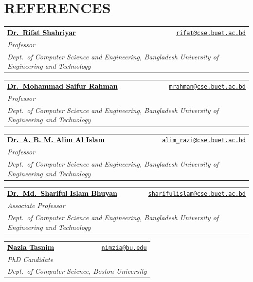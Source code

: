 \documentclass[letterpaper,11pt]{article}
\begin{document}
\newcommand{\referee}[5]{
  \item
    \begin{tabular*}{\linewidth}[t]{l@{\extracolsep{\fill}}r}
      \href{#5}{\textcolor{black}{\textbf{#1}}} & \small\href{mailto:#4}{\nolinkurl{#4}} \\
      \multicolumn{2}{l}{\small\textit{#2}} \\
      \multicolumn{2}{l}{\small\textit{#3}} \\
    \end{tabular*}\vspace{-4pt}
}
\section{REFERENCES}
  \begin{enumerate}[leftmargin=0.32in, labelsep=0.08in, label={\textbf{[\arabic*]}}, itemsep=5pt, topsep=6pt]
    \referee{Dr.\ Rifat Shahriyar}
      {Professor}
      {Dept.\ of Computer Science and Engineering, Bangladesh University of Engineering and Technology}
      {rifat@cse.buet.ac.bd}
      {https://scholar.google.com/citations?user=p-w4hOUAAAAJ}
    \referee{Dr.\ Mohammad Saifur Rahman}
      {Professor}
      {Dept.\ of Computer Science and Engineering, Bangladesh University of Engineering and Technology}
      {mrahman@cse.buet.ac.bd}
      {https://scholar.google.com/citations?user=9d52x-cAAAAJ}
    \referee{Dr.\ A. B. M. Alim Al Islam}
      {Professor}
      {Dept.\ of Computer Science and Engineering, Bangladesh University of Engineering and Technology}
      {alim_razi@cse.buet.ac.bd}
      {https://scholar.google.com/citations?user=K-AIPzQAAAAJ}
    \referee{Dr.\ Md.\ Shariful Islam Bhuyan}
      {Associate Professor}
      {Dept.\ of Computer Science and Engineering, Bangladesh University of Engineering and Technology}
      {sharifulislam@cse.buet.ac.bd}
      {https://scholar.google.com/citations?user=tXAX-IUAAAAJ}
    \referee{Nazia Tasnim}
      {PhD Candidate}
      {Dept.\ of Computer Science, Boston University}
      {nimzia@bu.edu}
      {https://scholar.google.com/citations?user=_9JYPbsAAAAJ}
  \end{enumerate}
\end{document}
